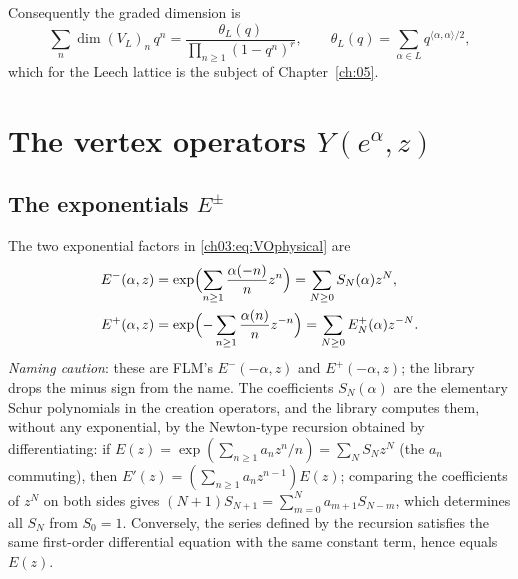 Consequently the graded dimension is
\begin{equation}\label{ch03:eq:latticechar}
  \sum_{n}\dim(V_L)_n\,q^n=\frac{\theta_L(q)}{\prod_{n\geq1}(1-q^n)^{r}},\qquad
  \theta_L(q)=\sum_{\alpha\in L}q^{\langle\alpha,\alpha\rangle/2},
\end{equation}
which for the Leech lattice is the subject of Chapter~\ref{ch:05}.

\section{The vertex operators \texorpdfstring{$Y(e^\alpha,z)$}{Y(e\^{}alpha,z)}}\label{ch03:sec:vertexops}

\subsection{The exponentials \texorpdfstring{$E^\pm$}{E+-}}

The two exponential factors in \eqref{ch03:eq:VOphysical} are
\begin{align}
  E^-(\alpha,z)&=\exp\Bigl(\sum_{n\ge1}\frac{\alpha(-n)}{n}z^n\Bigr)=\sum_{N\ge0}S_N(\alpha)z^N,
  \label{ch03:eq:Epm}\\
  E^+(\alpha,z)&=\exp\Bigl(-\sum_{n\ge1}\frac{\alpha(n)}{n}z^{-n}\Bigr)=\sum_{N\ge0}E^+_N(\alpha)z^{-N}.
  \notag
\end{align}
\emph{Naming caution}: these are FLM's $E^-(-\alpha,z)$ and $E^+(-\alpha,z)$; the library drops
the minus sign from the name. The coefficients $S_N(\alpha)$ are the elementary Schur polynomials
in the creation operators, and the library computes them, without any exponential, by the
Newton-type recursion obtained by differentiating: if $E(z)=\exp(\sum_{n\ge1} a_nz^n/n)=
\sum_NS_Nz^N$ (the $a_n$ commuting), then $E'(z)=(\sum_{n\ge1}a_nz^{n-1})E(z)$; comparing the
coefficients of $z^N$ on both sides gives $(N+1)S_{N+1}=\sum_{m=0}^{N}a_{m+1}S_{N-m}$, which
determines all $S_N$ from $S_0=1$. Conversely, the series defined by the recursion satisfies the
same first-order differential equation with the same constant term, hence equals $E(z)$.

